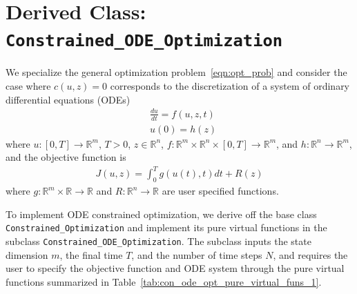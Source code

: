 \documentclass{article}
\def\R{{\mathbb R}}
\begin{document}
\section*{Derived Class: \texttt{Constrained\_ODE\_Optimization} }
We specialize the general optimization problem~\eqref{eqn:opt_prob} and consider the case where $c(u,z)=0$ corresponds to the discretization of a system of ordinary differential equations (ODEs)
\begin{align*}
&\frac{du}{dt} = f(u,z,t) \\
&u(0) = h(z)
\end{align*}
where $u:[0,T] \to \R^m$, $T>0$, $z \in \R^n$, $f:\R^m \times \R^n \times [0,T]  \to \R^m$, and $h:\R^n \to \R^m$, and the objective function is
\begin{align*}
J(u,z) = \int_0^{T} g(u(t),t) dt + R(z)
\end{align*}
where $g:\R^m \times \R \to \R$ and $R:\R^n \to \R$ are user specified functions.

To implement ODE constrained optimization, we derive off the base class \texttt{Constrained\_Optimization} and implement its pure virtual functions in the subclass \texttt{Constrained\_ODE\_Optimization}. The subclass inputs the state dimension $m$, the final time $T$, and the number of time steps $N$, and requires the user to specify the objective function and ODE system through the pure virtual functions summarized in Table~\ref{tab:con_ode_opt_pure_virtual_funs_1}.
\end{document}
